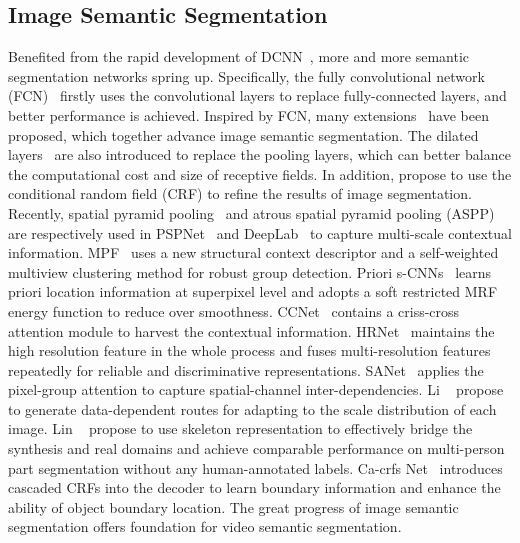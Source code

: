 \documentclass[journal]{IEEEtran}
\begin{document}
\subsection{Image Semantic Segmentation}
Benefited from the rapid development of DCNN~\cite{iandola2016squeezenet, simonyan2014very, he2016deep, szegedy2015going, huang2017densely}, more and more semantic segmentation networks spring up. Specifically, the fully convolutional network (FCN)~\cite{long2015fully} firstly uses the convolutional layers to replace fully-connected layers, and better performance is achieved. Inspired by FCN, many extensions~\cite{zhao2017pyramid, wu2019wider, lin2017refinenet} have been proposed, which together advance image semantic segmentation. The dilated layers~\cite{chen2018deeplab, yu2015multi} are also introduced to replace the pooling layers, which can better balance the computational cost and size of receptive fields. In addition, \cite{chen2018deeplab, chen2014semantic, zheng2015conditional} propose to use the conditional random field (CRF) to refine the results of image segmentation. Recently, spatial pyramid pooling~\cite{he2015spatial} and atrous spatial pyramid pooling (ASPP)~\cite{chen2017rethinking, chen2018deeplab} are respectively used in PSPNet~\cite{zhao2017pyramid} and DeepLab~\cite{chen2018deeplab} to capture multi-scale contextual information. MPF~\cite{wang2018detecting} uses a new structural context descriptor and a self-weighted multiview clustering method for robust group detection. Priori s-CNNs~\cite{wang2017joint} learns priori location information at superpixel level and adopts a soft restricted MRF energy function to reduce over smoothness. CCNet~\cite{Huang_2019_ICCV} contains a criss-cross attention module to harvest the contextual information. HRNet~\cite{Sun_2019_CVPR} maintains the high resolution feature in the whole process and fuses multi-resolution features repeatedly for reliable and discriminative representations. SANet~\cite{Zhong_2020_CVPR} applies the pixel-group attention to capture spatial-channel inter-dependencies. Li \etal~\cite{Li_2020_CVPR} propose to generate data-dependent routes for adapting to the scale distribution of each image. Lin \etal~\cite{lin2020cross} propose to use skeleton representation to effectively bridge the synthesis and real domains and achieve comparable performance on multi-person part segmentation without any human-annotated labels. Ca-crfs Net~\cite{ji2020encoder} introduces cascaded CRFs into the decoder to learn boundary information and enhance the ability of object boundary location. The great progress of image semantic segmentation offers foundation for video semantic segmentation.
\end{document}

